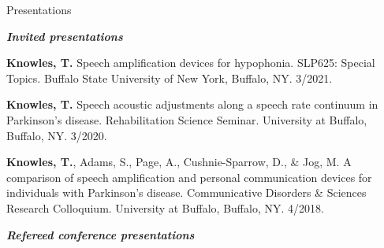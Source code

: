 \documentclass{resume} %
\begin{document}

\begin{rSection}{Presentations}

\begin{center}
	{\bf \emph{Invited presentations}}
\end{center}

\begin{etaremune}

\item {\bf Knowles, T.} Speech amplification devices for hypophonia. SLP625: Special Topics. Buffalo State University of New York, Buffalo, NY. 3/2021.

\item {\bf Knowles, T.} Speech acoustic adjustments along a speech rate continuum in Parkinson's disease. Rehabilitation Science Seminar. University at Buffalo, Buffalo, NY. 3/2020.



\item {\bf Knowles, T.}, Adams, S., Page, A., Cushnie-Sparrow, D., \& Jog, M. A comparison of speech amplification and personal communication devices for individuals with Parkinson's disease. Communicative Disorders \& Sciences Research Colloquium. University at Buffalo, Buffalo, NY. 4/2018.

\end{etaremune}


\begin{center}
	{\bf \emph{Refereed conference presentations}}
	

\end{center}
\end{rSection}
\end{document}
